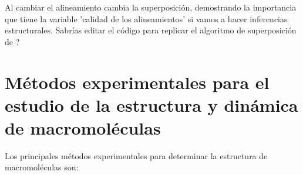 Al cambiar el alineamiento cambia la superposici\'{o}n, demostrando la importancia que tiene la 
variable 'calidad de los alineamientos' si vamos a hacer inferencias estructurales. Sabr\'{i}as editar el c\'{o}digo
para replicar el algoritmo de superposici\'{o}n de \cite{Chothia1986}?





\section{M\'{e}todos experimentales para el estudio de la estructura y din\'{a}mica de macromol\'{e}culas} \label{metodosExp}

Los principales m\'{e}todos experimentales para determinar la estructura de macromol\'{e}culas son:
